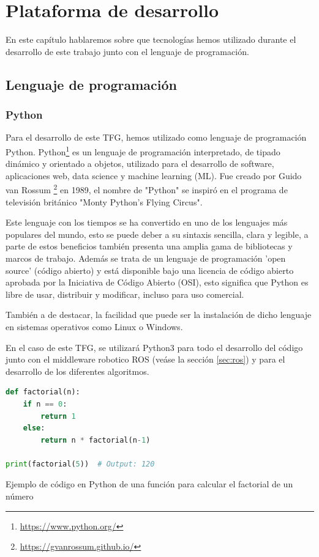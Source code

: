 \chapter{Plataforma de desarrollo}
\label{cap:capitulo3}

En este capítulo hablaremos sobre que tecnologías hemos utilizado durante el desarrollo de este trabajo junto con el lenguaje de programación.
\section{Lenguaje de programación}
\label{sec:programación}
\subsection{Python}
\label{sec:python}
Para el desarrollo de este TFG, hemos utilizado como lenguaje de programación Python. Python\footnote{\url{https://www.python.org/}} es un lenguaje de programación interpretado, de tipado dinámico y orientado a objetos,
utilizado para el desarrollo de software, aplicaciones web, data science y machine learning (ML).  
Fue creado por Guido van Rossum \footnote{\url{https://gvanrossum.github.io/}} en 1989, el nombre de "Python" se inspiró en el programa de televisión británico "Monty Python's Flying Circus". \newline

Este lenguaje con los tiempos se ha convertido en uno de los lenguajes más populares del mundo, esto se puede deber a su sintaxis sencilla, clara y legible, a parte 
de estos beneficios también presenta una amplia gama de bibliotecas y marcos de trabajo. Además se trata de un lenguaje de programación 'open source' (código abierto) y está disponible bajo
una licencia de código abierto aprobada por la Iniciativa de Código Abierto (OSI), esto significa que Python es libre de usar, distribuir y modificar, incluso para uso
comercial. \newline

También a de destacar, la facilidad que puede ser la instalación de dicho lenguaje en sistemas operativos como Linux o Windows. \newline

En el caso de este TFG, se utilizará Python3 para todo el desarrollo del código junto con el middleware robotico ROS (veáse la sección \ref{sec:ros}) y para el desarrollo
de los diferentes algoritmos. 
\newline

\begin{code}[h]
\begin{lstlisting}[language=Python]
  def factorial(n):
    if n == 0:
        return 1
    else:
        return n * factorial(n-1)

print(factorial(5))  # Output: 120

\end{lstlisting}
\caption[Ejemplo de código en Python de una función para calcular el factorial de un número]{Ejemplo de código en Python de una función para calcular el factorial de un número}
\label{cod:codejemplo}
\end{code}  


